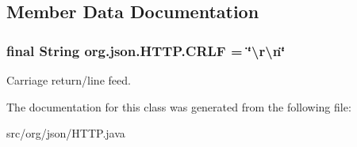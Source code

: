 \subsection{Member Data Documentation}
\hypertarget{classorg_1_1json_1_1HTTP_a7feb3304ccde0415ee29b8f997fb65b6}{
\subsubsection[{C\-R\-L\-F}]{\setlength{\rightskip}{0pt plus 5cm}final String org.\-json.\-H\-T\-T\-P.\-C\-R\-L\-F = \char`\"{}\textbackslash{}r\textbackslash{}n\char`\"{}\hspace{0.3cm}{\ttfamily [static]}}}\label{classorg_1_1json_1_1HTTP_a7feb3304ccde0415ee29b8f997fb65b6}
Carriage return/line feed. 

The documentation for this class was generated from the following file\-:\begin{DoxyCompactItemize}
\item 
src/org/json/H\-T\-T\-P.\-java\end{DoxyCompactItemize}
